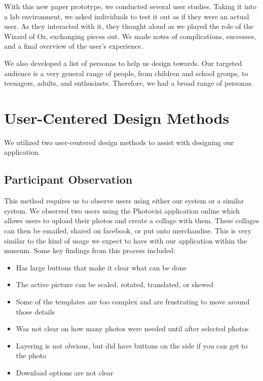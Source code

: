 \documentclass{tei2013}
\begin{document}
With this new paper prototype, we conducted several user studies. Taking it into a lab environment, we asked individuals to test it out as if they were an actual user. As they interacted with it, they thought aloud as we played the role of the Wizard of Oz, exchanging pieces out. We made notes of complications, successes, and a final overview of the user's experience. 

We also developed a list of personas to help us design towards. Our targeted audience is a very general range of people, from children and school groups, to teenagers, adults, and enthusiasts. Therefore, we had a broad range of personas. 

\section{User-Centered Design Methods}
We utilized two user-centered design methods to assist with designing our application.
\subsection{Participant Observation}
This method requires us to observe users using either our system or a similar system.  We observed two users using the Photovisi application online which allows users to upload their photos and create a collage with them.  These collages can then be emailed, shared on facebook, or put onto merchandise.  This is very similar to the kind of usage we expect to have with our application within the museum.  Some key findings from this process included:
\begin{itemize}\itemsep0em
\item{Has large buttons that make it clear what can be done}
\item{The active picture can be scaled, rotated, translated, or skewed}
\item{Some of the templates are too complex and are frustrating to move around those details}
\item{Was not clear on how many photos were needed until after selected photos}
\item{Layering is not obvious, but did have buttons on the side if you can get to the photo}
\item{Download options are not clear}
\end{itemize}
\end{document}
